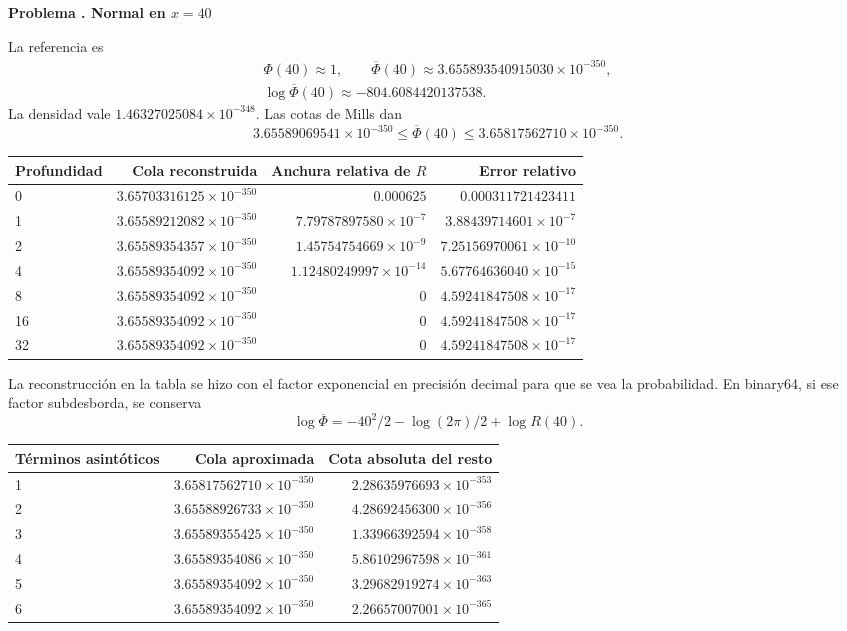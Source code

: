 \documentclass[11pt,a4paper]{article}
\theoremstyle{definition}
\newcommand{\Q}{\overline\Phi}
\newcounter{problema}
\newenvironment{resuelto}[1]{\refstepcounter{problema}\par\medskip\Needspace{6\baselineskip}\textbf{Problema \theproblema. #1}\par}{\par\medskip}
\begin{document}
\begin{resuelto}{Normal en $x=40$}
La referencia es
\[
\begin{gathered}
\Phi(40)\approx1,\qquad \Q(40)\approx3.655893540915030\times10^{-350},\\
\log\Q(40)\approx-804.6084420137538.
\end{gathered}
\]
La densidad vale $1.46327025084\times10^{-348}$. Las cotas de Mills dan
\[
3.65589069541\times10^{-350}\le\Q(40)\le3.65817562710\times10^{-350}.
\]

\begin{center}\small\begin{tabular}{lrrr}
\toprule
Profundidad & Cola reconstruida & Anchura relativa de $R$ & Error relativo\\\midrule
0 & $3.65703316125\times10^{-350}$ & $0.000625$ & $0.000311721423411$\\
1 & $3.65589212082\times10^{-350}$ & $7.79787897580\times10^{-7}$ & $3.88439714601\times10^{-7}$\\
2 & $3.65589354357\times10^{-350}$ & $1.45754754669\times10^{-9}$ & $7.25156970061\times10^{-10}$\\
4 & $3.65589354092\times10^{-350}$ & $1.12480249997\times10^{-14}$ & $5.67764636040\times10^{-15}$\\
8 & $3.65589354092\times10^{-350}$ & $0$ & $4.59241847508\times10^{-17}$\\
16 & $3.65589354092\times10^{-350}$ & $0$ & $4.59241847508\times10^{-17}$\\
32 & $3.65589354092\times10^{-350}$ & $0$ & $4.59241847508\times10^{-17}$\\
\bottomrule\end{tabular}\end{center}

La reconstrucción en la tabla se hizo con el factor exponencial en precisión decimal para que se vea la probabilidad. En binary64, si ese factor subdesborda, se conserva
\[
\log\Q=-40^2/2-\log(2\pi)/2+\log R(40).
\]

\begin{center}\small\begin{tabular}{lrr}
\toprule
Términos asintóticos & Cola aproximada & Cota absoluta del resto\\\midrule
1 & $3.65817562710\times10^{-350}$ & $2.28635976693\times10^{-353}$\\
2 & $3.65588926733\times10^{-350}$ & $4.28692456300\times10^{-356}$\\
3 & $3.65589355425\times10^{-350}$ & $1.33966392594\times10^{-358}$\\
4 & $3.65589354086\times10^{-350}$ & $5.86102967598\times10^{-361}$\\
5 & $3.65589354092\times10^{-350}$ & $3.29682919274\times10^{-363}$\\
6 & $3.65589354092\times10^{-350}$ & $2.26657007001\times10^{-365}$\\
\bottomrule\end{tabular}\end{center}


\end{resuelto}
\end{document}
